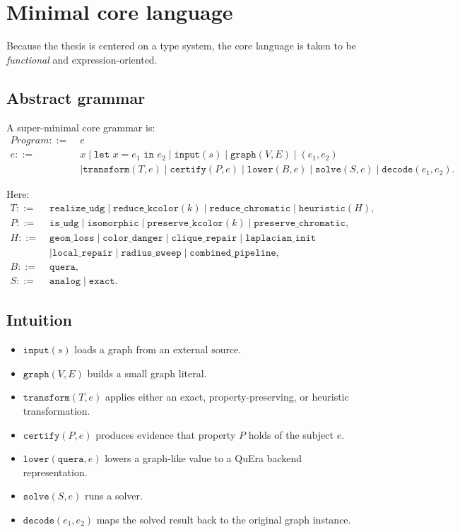 \documentclass[11pt]{article}
\begin{document}
\section{Minimal core language}

Because the thesis is centered on a type system, the core language is taken to be \emph{functional} and expression-oriented.

\subsection{Abstract grammar}

A super-minimal core grammar is:
\[
\begin{aligned}
\mathit{Program} ::=\;& e \\
 e ::=\;& x
 \mid \texttt{let }x=e_1\texttt{ in }e_2
 \mid \texttt{input}(s)
 \mid \texttt{graph}(V,E)
 \mid (e_1,e_2)\\
 &\mid \texttt{transform}(T,e)
 \mid \texttt{certify}(P,e)
 \mid \texttt{lower}(B,e)
 \mid \texttt{solve}(S,e)
 \mid \texttt{decode}(e_1,e_2).
\end{aligned}
\]

Here:
\[
\begin{aligned}
T ::=\;& \texttt{realize\_udg}
\mid \texttt{reduce\_kcolor}(k)
\mid \texttt{reduce\_chromatic}
\mid \texttt{heuristic}(H),\\[1mm]
P ::=\;& \texttt{is\_udg}
\mid \texttt{isomorphic}
\mid \texttt{preserve\_kcolor}(k)
\mid \texttt{preserve\_chromatic},\\[1mm]
H ::=\;& \texttt{geom\_loss} \mid \texttt{color\_danger} \mid \texttt{clique\_repair}
\mid \texttt{laplacian\_init}\\
&\mid \texttt{local\_repair} \mid \texttt{radius\_sweep} \mid \texttt{combined\_pipeline},\\[1mm]
B ::=\;& \texttt{quera},\\[1mm]
S ::=\;& \texttt{analog}
\mid \texttt{exact}.
\end{aligned}
\]

\subsection{Intuition}
\begin{itemize}
    \item $\texttt{input}(s)$ loads a graph from an external source.
    \item $\texttt{graph}(V,E)$ builds a small graph literal.
    \item $\texttt{transform}(T,e)$ applies either an exact, property-preserving, or heuristic transformation.
    \item $\texttt{certify}(P,e)$ produces evidence that property $P$ holds of the subject $e$.
    \item $\texttt{lower}(\texttt{quera},e)$ lowers a graph-like value to a QuEra backend representation.
    \item $\texttt{solve}(S,e)$ runs a solver.
    \item $\texttt{decode}(e_1,e_2)$ maps the solved result back to the original graph instance.
\end{itemize}
\end{document}
